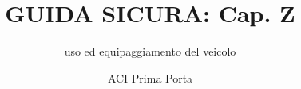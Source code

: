 


\newcommand*\circled[1]{
\tikz[baseline=(char.base)]{\node[shape=circle,draw,inner sep=2pt] (char) {#1};}
}

\newcommand{\quizV}{     
\begin{center}
     	\only<1>{\Huge{\circled{V}} \Huge{\circled{F}}}
        	\only<2->{\hspace{-4.6mm}\Huge{\color{green}{\circled{V}}} \Huge{\circled{F}}}
\end{center}
}
     
\newcommand{\quizF}{     
\begin{center}
  	 \only<1>{\Huge{\circled{V}} \Huge{\circled{F}}}
       	 \only<2->{\hspace{-4.6mm}\Huge{\circled{V}} \Huge{\color{red}{\circled{F}}}}
\end{center}}






\documentclass{beamer}
\usepackage{animate}

\title{GUIDA SICURA: Cap. Z}
\subtitle{uso ed equipaggiamento del veicolo}
\author{ACI Prima Porta}
\date{}


\begin{frame}
        \maketitle
\end{frame}
    
    
